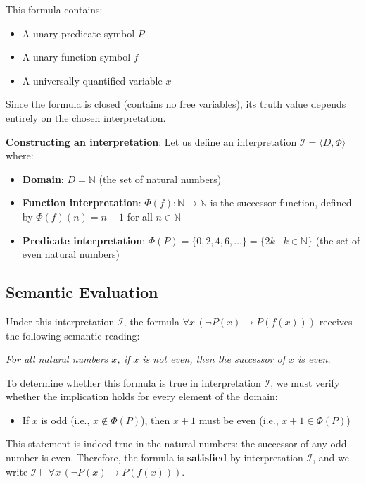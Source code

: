\documentclass[11pt,a4paper]{article}
\theoremstyle{definition}
\theoremstyle{plain}
\theoremstyle{remark}
\newcommand{\N}{\mathbb{N}}
\begin{document}
This formula contains:
\begin{itemize}
    \item A unary predicate symbol $P$
    \item A unary function symbol $f$
    \item A universally quantified variable $x$
\end{itemize}

Since the formula is closed (contains no free variables), its truth value depends entirely on the chosen interpretation.

\textbf{Constructing an interpretation}: Let us define an interpretation $\mathcal{I} = \langle D, \Phi \rangle$ where:
\begin{itemize}
    \item \textbf{Domain}: $D = \N$ (the set of natural numbers)
    \item \textbf{Function interpretation}: $\Phi(f) : \N \rightarrow \N$ is the successor function, defined by $\Phi(f)(n) = n + 1$ for all $n \in \N$
    \item \textbf{Predicate interpretation}: $\Phi(P) = \{0, 2, 4, 6, \dots\} = \{2k \mid k \in \N\}$ (the set of even natural numbers)
\end{itemize}

\subsection{Semantic Evaluation}

Under this interpretation $\mathcal{I}$, the formula $\forall x \, (\neg P(x) \rightarrow P(f(x)))$ receives the following semantic reading:

\textit{For all natural numbers $x$, if $x$ is not even, then the successor of $x$ is even.}

To determine whether this formula is true in interpretation $\mathcal{I}$, we must verify whether the implication holds for every element of the domain:
\begin{itemize}
    \item If $x$ is odd (i.e., $x \notin \Phi(P)$), then $x + 1$ must be even (i.e., $x + 1 \in \Phi(P)$)
\end{itemize}

This statement is indeed true in the natural numbers: the successor of any odd number is even. Therefore, the formula is \textbf{satisfied} by interpretation $\mathcal{I}$, and we write $\mathcal{I} \models \forall x \, (\neg P(x) \rightarrow P(f(x)))$.
\end{document}
